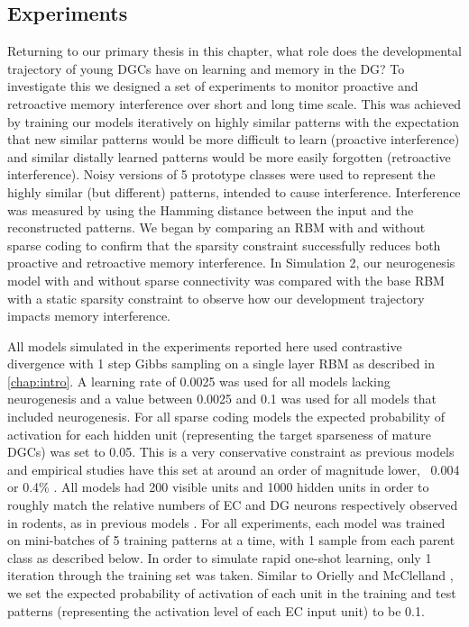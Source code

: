 \subsection{Experiments}

Returning to our primary thesis in this chapter, what role does the developmental trajectory 
of young \acp{DGC} have on learning and memory in the \ac{DG}?
To investigate this we designed a set of experiments to monitor proactive and retroactive 
memory interference over short and long time scale.
This was achieved by training our models iteratively on highly similar patterns with the expectation 
that new similar patterns would be more difficult to learn (proactive interference) and 
similar distally learned patterns would be more easily forgotten (retroactive interference).
Noisy versions of 5 prototype classes were used to represent the highly similar (but different) 
patterns, intended to cause interference.
Interference was measured by using the Hamming distance between the input and the
reconstructed patterns.
We began by comparing an \ac{RBM} with and without sparse coding to confirm that the 
sparsity constraint successfully reduces both proactive and retroactive memory interference.
In Simulation 2, our neurogenesis model with and without sparse connectivity was compared 
with the base \ac{RBM} with a static sparsity constraint to observe how our development trajectory 
impacts memory interference.

All models simulated in the experiments reported here used contrastive divergence with 1 step Gibbs sampling on a 
single layer \ac{RBM} as described in \cref{chap:intro}.  
A learning rate of 0.0025 was used for all models lacking neurogenesis and a value 
between 0.0025 and 0.1 was used for all models that included neurogenesis. 
For all sparse coding models the expected probability of 
activation for each hidden unit (representing the target sparseness of mature \acp{DGC}) was set to 0.05. 
This is a very conservative constraint as previous models and empirical studies have this set 
at around an order of magnitude lower, ~0.004 or 0.4\% \citep{barnes-et-al-90,jung-mcnaughton-93}. 
All models had 200 visible units and 1000 
hidden units in order to roughly match the relative numbers of \ac{EC} and \ac{DG} neurons respectively
observed in rodents, as in previous models \citep{oreilly_hippocampal_encoding_storage_and_recall}.
For all experiments, each model was trained on mini-batches of 5 training patterns at a time, with 
1 sample from each parent class as described below. 
In order to simulate rapid one-shot learning, only 1
iteration through the training set was taken.
Similar to Orielly and McClelland \citeyearpar{oreilly_hippocampal_encoding_storage_and_recall}, we set the
expected probability of activation of each unit in the training and test patterns (representing the activation
level of each \ac{EC} input unit) to be 0.1.


